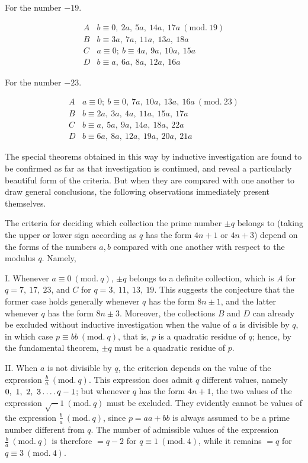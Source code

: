 %
\begin{center}For the number $-19$.\end{center}
\[
\begin{array}{c|l}
A&b\equiv0,\ 2a,\ 5a,\ 14a,\ 17a\ (\mathrm{mod.}\ 19)\\
B&b\equiv3a,\ 7a,\ 11a,\ 13a,\ 18a\\
C&a\equiv0;\ b\equiv4a,\ 9a,\ 10a,\ 15a\\
D&b\equiv a,\ 6a,\ 8a,\ 12a,\ 16a
\end{array}
\]

\begin{center}For the number $-23$.\end{center}
\[
\begin{array}{c|l}
A&a\equiv0;\ b\equiv0,\ 7a,\ 10a,\ 13a,\ 16a\ (\mathrm{mod.}\ 23)\\
B&b\equiv2a,\ 3a,\ 4a,\ 11a,\ 15a,\ 17a\\
C&b\equiv a,\ 5a,\ 9a,\ 14a,\ 18a,\ 22a\\
D&b\equiv6a,\ 8a,\ 12a,\ 19a,\ 20a,\ 21a
\end{array}
\]

The special theorems obtained in this way by inductive investigation are found to be confirmed as far as that investigation is continued, and reveal a particularly beautiful form of the criteria. But when they are compared with one another to draw general conclusions, the following observations immediately present themselves.

The criteria for deciding which collection the prime number $\pm q$ belongs to (taking the upper or lower sign according as $q$ has the form $4n+1$ or $4n+3$) depend on the forms of the numbers $a,b$ compared with one another with respect to the modulus $q$. Namely,

I. Whenever $a\equiv0\ (\mathrm{mod.}\ q)$, $\pm q$ belongs to a definite collection, which is $A$ for $q=7,\ 17,\ 23$, and $C$ for $q=3,\ 11,\ 13,\ 19$. This suggests the conjecture that the former case holds generally whenever $q$ has the form $8n\pm1$, and the latter whenever $q$ has the form $8n\pm3$. Moreover, the collections $B$ and $D$ can already be excluded without inductive investigation when the value of $a$ is divisible by $q$, in which case $p\equiv bb\ (\mathrm{mod.}\ q)$, that is, $p$ is a quadratic residue of $q$; hence, by the fundamental theorem, $\pm q$ must be a quadratic residue of $p$.

II. When $a$ is not divisible by $q$, the criterion depends on the value of the expression $\frac ba\ (\mathrm{mod.}\ q)$. This expression does admit $q$ different values, namely $0,\ 1,\ 2,\ 3\dotsfour q-1$; but whenever $q$ has the form $4n+1$, the two
%
values of the expression $\surd-1\ (\mathrm{mod.}\ q)$ must be excluded. They evidently cannot be values of the expression $\frac ba\ (\mathrm{mod.}\ q)$, since $p=aa+bb$ is always assumed to be a prime number different from $q$. The number of admissible values of the expression $\frac ba\ (\mathrm{mod.}\ q)$ is therefore $=q-2$ for $q\equiv1\ (\mathrm{mod.}\ 4)$, while it remains $=q$ for $q\equiv3\ (\mathrm{mod.}\ 4)$.

